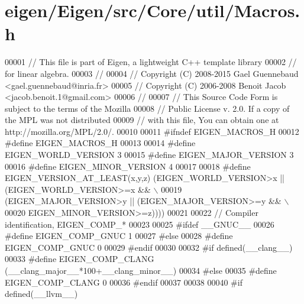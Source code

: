 \hypertarget{eigen_2_eigen_2src_2_core_2util_2_macros_8h_source}{}\section{eigen/\+Eigen/src/\+Core/util/\+Macros.h}
\label{eigen_2_eigen_2src_2_core_2util_2_macros_8h_source}

\begin{DoxyCode}
00001 \textcolor{comment}{// This file is part of Eigen, a lightweight C++ template library}
00002 \textcolor{comment}{// for linear algebra.}
00003 \textcolor{comment}{//}
00004 \textcolor{comment}{// Copyright (C) 2008-2015 Gael Guennebaud <gael.guennebaud@inria.fr>}
00005 \textcolor{comment}{// Copyright (C) 2006-2008 Benoit Jacob <jacob.benoit.1@gmail.com>}
00006 \textcolor{comment}{//}
00007 \textcolor{comment}{// This Source Code Form is subject to the terms of the Mozilla}
00008 \textcolor{comment}{// Public License v. 2.0. If a copy of the MPL was not distributed}
00009 \textcolor{comment}{// with this file, You can obtain one at http://mozilla.org/MPL/2.0/.}
00010 
00011 \textcolor{preprocessor}{#ifndef EIGEN\_MACROS\_H}
00012 \textcolor{preprocessor}{#define EIGEN\_MACROS\_H}
00013 
00014 \textcolor{preprocessor}{#define EIGEN\_WORLD\_VERSION 3}
00015 \textcolor{preprocessor}{#define EIGEN\_MAJOR\_VERSION 3}
00016 \textcolor{preprocessor}{#define EIGEN\_MINOR\_VERSION 4}
00017 
00018 \textcolor{preprocessor}{#define EIGEN\_VERSION\_AT\_LEAST(x,y,z) (EIGEN\_WORLD\_VERSION>x || (EIGEN\_WORLD\_VERSION>=x && \(\backslash\)}
00019 \textcolor{preprocessor}{                                      (EIGEN\_MAJOR\_VERSION>y || (EIGEN\_MAJOR\_VERSION>=y && \(\backslash\)}
00020 \textcolor{preprocessor}{                                                                 EIGEN\_MINOR\_VERSION>=z))))}
00021 
00022 \textcolor{comment}{// Compiler identification, EIGEN\_COMP\_*}
00023 
00025 \textcolor{preprocessor}{#ifdef \_\_GNUC\_\_}
00026 \textcolor{preprocessor}{  #define EIGEN\_COMP\_GNUC 1}
00027 \textcolor{preprocessor}{#else}
00028 \textcolor{preprocessor}{  #define EIGEN\_COMP\_GNUC 0}
00029 \textcolor{preprocessor}{#endif}
00030 
00032 \textcolor{preprocessor}{#if defined(\_\_clang\_\_)}
00033 \textcolor{preprocessor}{  #define EIGEN\_COMP\_CLANG (\_\_clang\_major\_\_*100+\_\_clang\_minor\_\_)}
00034 \textcolor{preprocessor}{#else}
00035 \textcolor{preprocessor}{  #define EIGEN\_COMP\_CLANG 0}
00036 \textcolor{preprocessor}{#endif}
00037 
00038 
00040 \textcolor{preprocessor}{#if defined(\_\_llvm\_\_)}

\end{DoxyCode}
